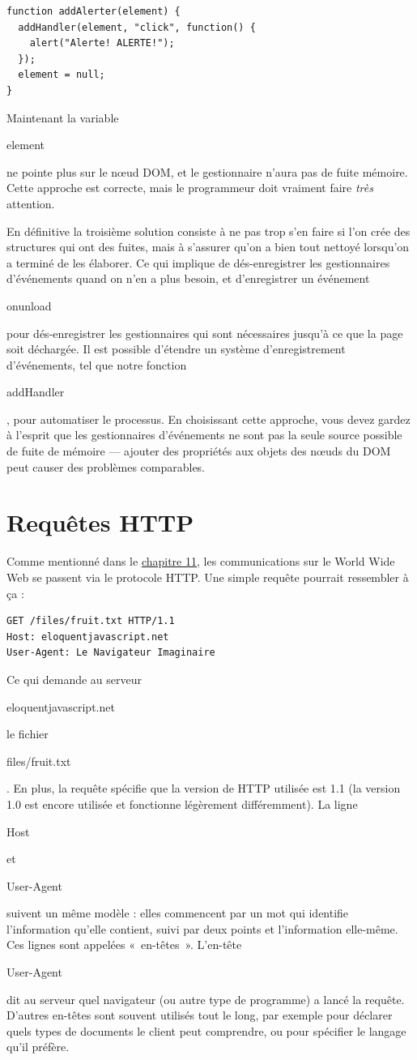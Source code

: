 \documentclass{FramateX}
\renewcommand{\texttt}[1]{\begin{sffamily}{#1}\end{sffamily}}
\begin{document}
\begin{lstlisting}
function addAlerter(element) {
  addHandler(element, "click", function() {
    alert("Alerte! ALERTE!");
  });
  element = null;
}
\end{lstlisting}
Maintenant la variable \texttt{element} ne pointe plus sur le nœud DOM,
et le gestionnaire n'aura pas de fuite mémoire. Cette approche est
correcte, mais le programmeur doit vraiment faire \emph{très} attention.

En définitive la troisième solution consiste à ne pas trop s'en faire si
l'on crée des structures qui ont des fuites, mais à s'assurer qu'on a
bien tout nettoyé lorsqu'on a terminé de les élaborer. Ce qui implique
de dés-enregistrer les gestionnaires d'événements quand on n'en a plus
besoin, et d'enregistrer un événement \texttt{onunload} pour
dés-enregistrer les gestionnaires qui sont nécessaires jusqu'à ce que la
page soit déchargée. Il est possible d'étendre un système
d'enregistrement d'événements, tel que notre fonction
\texttt{addHandler}, pour automatiser le processus. En choisissant cette
approche, vous devez gardez à l'esprit que les gestionnaires
d'événements ne sont pas la seule source possible de fuite de mémoire
--- ajouter des propriétés aux objets des nœuds du DOM peut causer des
problèmes comparables.

\chapter{Requêtes HTTP}

Comme mentionné dans le \href{chapter11.html}{chapitre 11}, les
communications sur le World Wide Web se passent via le protocole HTTP.
Une simple requête pourrait ressembler à ça :

\begin{lstlisting}
GET /files/fruit.txt HTTP/1.1
Host: eloquentjavascript.net
User-Agent: Le Navigateur Imaginaire
\end{lstlisting}
Ce qui demande au serveur \texttt{eloquentjavascript.net} le fichier
\texttt{files/fruit.txt}. En plus, la requête spécifie que la version de
HTTP utilisée est 1.1 (la version 1.0 est encore utilisée et fonctionne
légèrement différemment). La ligne \texttt{Host} et \texttt{User-Agent}
suivent un même modèle : elles commencent par un mot qui identifie
l'information qu'elle contient, suivi par deux points et l'information
elle-même. Ces lignes sont appelées «~en-têtes~». L'en-tête
\texttt{User-Agent} dit au serveur quel navigateur (ou autre type de
programme) a lancé la requête. D'autres en-têtes sont souvent utilisés
tout le long, par exemple pour déclarer quels types de documents le
client peut comprendre, ou pour spécifier le langage qu'il préfère.
\end{document}
